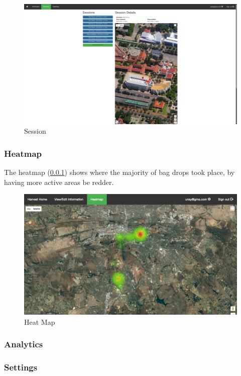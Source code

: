 \documentclass[11pt]{article}
\begin{document}
\begin{figure}
 \centering
 \includegraphics[width=12cm, keepaspectratio]{Images/webSession.png}
 \caption{Session}
 \label{webSession}
\end{figure}

\subsubsection{Heatmap}
\label{webHeatmap}

The heatmap (\ref{webHeatmap}) shows where the majority of bag drops took place, by having more active areas be redder.

\begin{figure}
 \centering
 \includegraphics[width=12cm, keepaspectratio]{Images/webHeatMap.png}
 \caption{Heat Map}
 \label{HeatMap}
\end{figure}
\subsubsection{Analytics}
\label{webAnalytics}
\subsubsection{Settings}
\label{webSettings}
\end{document}
